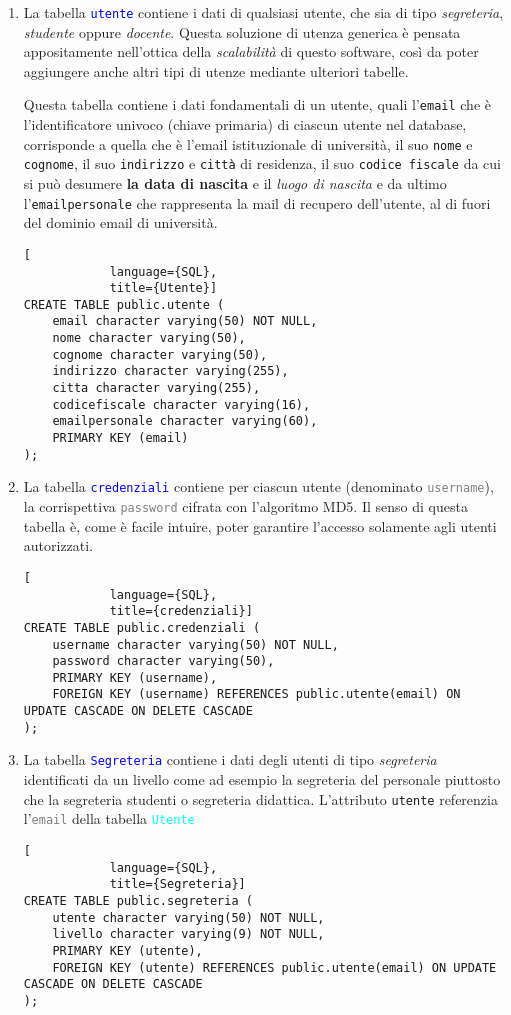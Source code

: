 \documentclass{article}
\newcommand{\tabb}[1]{\texttt{\textcolor{blue}{#1}}}
\newcommand{\tab}[1]{\texttt{\textcolor{cyan}{#1}}}
\newcommand{\attr}[1]{\texttt{\textcolor{gray}{#1}}}
\begin{document}
    \begin{enumerate}
        \item La tabella \tabb{utente} contiene i dati di qualsiasi utente, che sia di tipo \emph{segreteria}, \emph{studente} oppure \emph{docente}. Questa soluzione di utenza generica è pensata appositamente nell'ottica della \emph{scalabilità} di questo software, così da poter aggiungere anche altri tipi di utenze mediante ulteriori tabelle.

        Questa tabella contiene i dati fondamentali di un utente, quali l'\texttt{email} che è l'identificatore univoco (chiave primaria) di ciascun utente nel database, corrisponde a quella che è l'email istituzionale di università, il suo \texttt{nome} e \texttt{cognome}, il suo \texttt{indirizzo} e \texttt{città} di residenza, il suo \texttt{codice fiscale} da cui si può desumere \textbf{la data di nascita} e il \textit{luogo di nascita} e da ultimo l'\texttt{emailpersonale} che rappresenta la mail di recupero dell'utente, al di fuori del dominio email di università.
        \begin{lstlisting}[
            language={SQL},
            title={Utente}]
CREATE TABLE public.utente (
    email character varying(50) NOT NULL,
    nome character varying(50),
    cognome character varying(50),
    indirizzo character varying(255),
    citta character varying(255),
    codicefiscale character varying(16),
    emailpersonale character varying(60),
    PRIMARY KEY (email)
);
        \end{lstlisting}

        \item La tabella \tabb{credenziali} contiene per ciascun utente (denominato \attr{username}), la corrispettiva \attr{password} cifrata con l'algoritmo MD5. Il senso di questa tabella è, come è facile intuire, poter garantire l'accesso solamente agli utenti autorizzati.
        \begin{lstlisting}[
            language={SQL},
            title={credenziali}]
CREATE TABLE public.credenziali (
    username character varying(50) NOT NULL,
    password character varying(50),
    PRIMARY KEY (username),
    FOREIGN KEY (username) REFERENCES public.utente(email) ON UPDATE CASCADE ON DELETE CASCADE
);
        \end{lstlisting}

        \item La tabella \tabb{Segreteria} contiene i dati degli utenti di tipo \textit{segreteria} identificati da un livello come ad esempio la segreteria del personale piuttosto che la segreteria studenti o segreteria didattica. L'attributo \texttt{utente} referenzia l'\attr{email} della tabella \tab{Utente}
        \begin{lstlisting}[
            language={SQL},
            title={Segreteria}]
CREATE TABLE public.segreteria (
    utente character varying(50) NOT NULL,
    livello character varying(9) NOT NULL,
    PRIMARY KEY (utente),
    FOREIGN KEY (utente) REFERENCES public.utente(email) ON UPDATE CASCADE ON DELETE CASCADE
);
        \end{lstlisting}


\end{enumerate}
\end{document}
